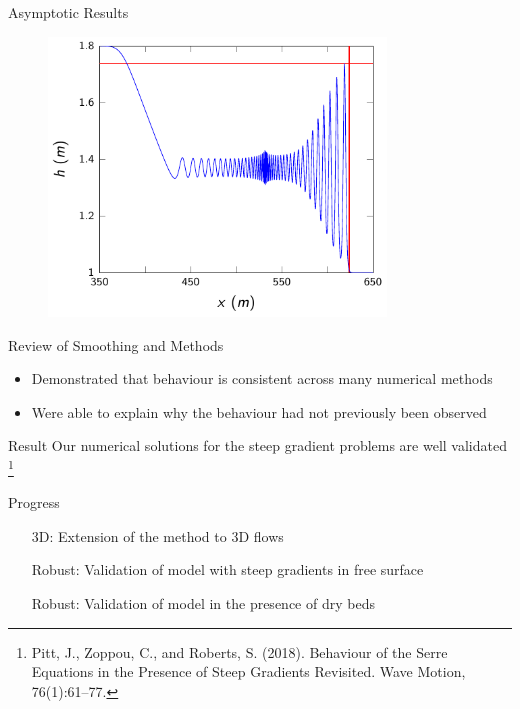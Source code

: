 \documentclass[pdf]{beamer}
\begin{document}
\begin{frame}{Asymptotic Results}
	\begin{figure}
		\includegraphics[width=0.8\textwidth]{./Pics/SteepGradients/DSWap1.pdf}
	\end{figure}
\end{frame}

\begin{frame}{Review of Smoothing and Methods}
	\begin{itemize}
		\item Demonstrated that behaviour is consistent across many numerical methods
		\item Were able to explain why the behaviour had not previously been observed
	\end{itemize}
\end{frame}

\begin{frame}{Result}
	Our numerical solutions for the steep gradient problems are well validated \footnote{Pitt, J., Zoppou, C., and Roberts, S. (2018).
		Behaviour of the Serre Equations in the Presence of Steep
		Gradients Revisited.
		Wave Motion, 76(1):61–77.}
\end{frame}

\begin{frame}{Progress}
	\begin{itemize}
		\item[3D:] Extension of the method to 3D flows  \checkmark
		\item[Robust:] Validation of model with steep gradients in free surface \checkmark 
		\item[Robust:] Validation of model in the presence of dry beds 
	\end{itemize}
\end{frame}
\end{document}
